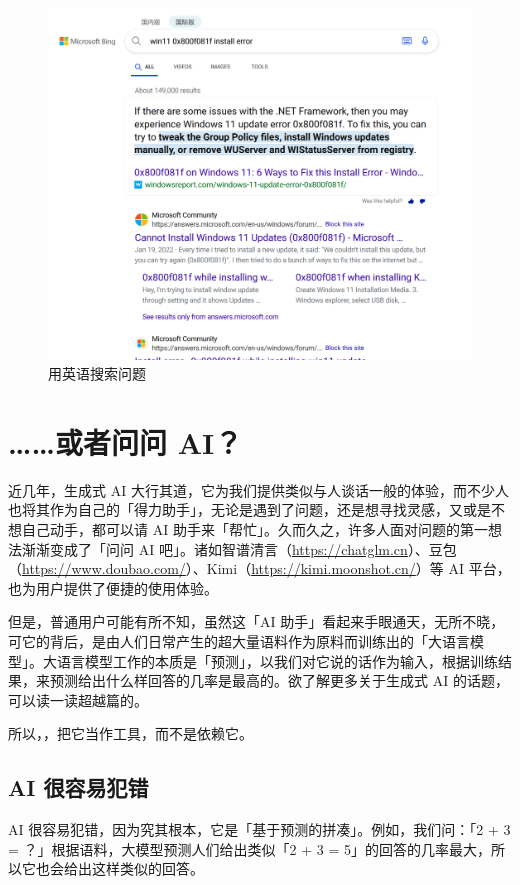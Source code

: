 \begin{figure}[htb!]
  \centering
  \includegraphics[width=.75\textwidth]{assets/basic/Win11_WU_error_eng.png}
  \caption{用英语搜索问题}
  \label{fig:Win11_WU_error_eng}
\end{figure}

\section{……或者问问 AI？}

近几年，生成式 AI 大行其道，它为我们提供类似与人谈话一般的体验，而不少人也将其作为自己的「得力助手」，无论是遇到了问题，还是想寻找灵感，又或是不想自己动手，都可以请 AI 助手来「帮忙」。久而久之，许多人面对问题的第一想法渐渐变成了「问问 AI 吧」。诸如智谱清言（\url{https://chatglm.cn}）、豆包（\url{https://www.doubao.com/}）、Kimi（\url{https://kimi.moonshot.cn/}）等 AI 平台，也为用户提供了便捷的使用体验。

但是，普通用户可能有所不知，虽然这「AI 助手」看起来手眼通天，无所不晓，可它的背后，是由人们日常产生的超大量语料作为原料而训练出的「大语言模型」。大语言模型工作的本质是「预测」，以我们对它说的话作为输入，根据训练结果，来预测给出什么样回答的几率是最高的。欲了解更多关于生成式 AI 的话题，可以读一读超越篇的。

所以，，把它当作工具，而不是依赖它。

\subsection{AI 很容易犯错}

AI 很容易犯错，因为究其根本，它是「基于预测的拼凑」。例如，我们问：「2 + 3 = ？」根据语料，大模型预测人们给出类似「2 + 3 = 5」的回答的几率最大，所以它也会给出这样类似的回答。

